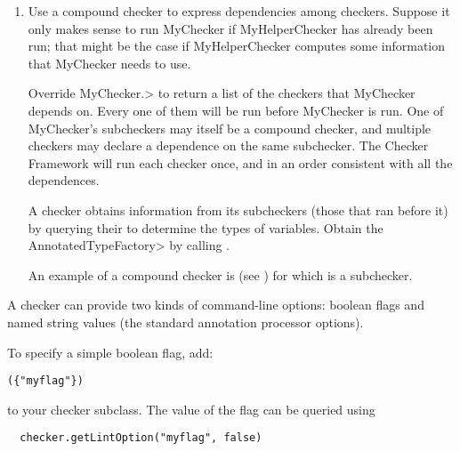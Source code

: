 \begin{enumerate}
\item
Use a compound checker to express dependencies among checkers.  Suppose it
only makes sense to run MyChecker if MyHelperChecker has already been run;
that might be the case if MyHelperChecker computes some information that
MyChecker needs to use.

Override
\<MyChecker.>
to return a list of the checkers that MyChecker depends on.  Every one of
them will be run before MyChecker is run.  One of MyChecker's subcheckers
may itself be a compound checker, and multiple checkers may declare a
dependence on the same subchecker.  The Checker Framework will run each
checker once, and in an order consistent with all the dependences.

A checker obtains information from its subcheckers (those that ran before
it) by querying their  to
determine the types of variables.  Obtain the \<AnnotatedTypeFactory> by
calling
.

An example of a compound checker is
(see ) for which 
is a subchecker.
\end{enumerate}




A checker can provide two kinds of command-line options:
boolean flags and
named string values (the standard annotation processor
options).


To specify a simple boolean flag, add:

\begin{alltt}
  (\{"myflag"\})
\end{alltt}

\noindent
to your checker subclass.
The value of the flag can be queried using

\begin{Verbatim}
  checker.getLintOption("myflag", false)
\end{Verbatim}

